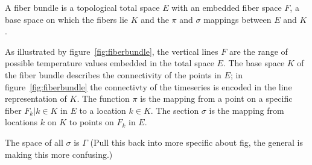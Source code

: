 \documentclass[../main.tex]{subfiles}
\begin{document}
A fiber bundle is a topological total space $E$ with an embedded fiber space $F$, a base space on which the fibers lie $K$ and the $\pi$ and $\sigma$ mappings between $E$ and $K$. 


As illustrated by figure~\ref{fig:fiberbundle}, the vertical lines $F$ are the range of possible temperature values embedded in the total space $E$. The base space $K$ of the fiber bundle describes the connectivity of the points in $E$; in figure~\ref{fig:fiberbundle} the connectivty of the timeseries is encoded in the line representation of $K$. The function $\pi$ is the mapping from a point on a specific fiber $F_{k}|k\in K$ in $E$ to a location $k \in K$. 
The section $\sigma$ is the mapping from locations $k$ on $K$ to points on $F_{k}$ in $E$.

The space of all $\sigma$ is $\Gamma$  (Pull this back into more specific about fig, the general is making this more confusing.)
\end{document}
